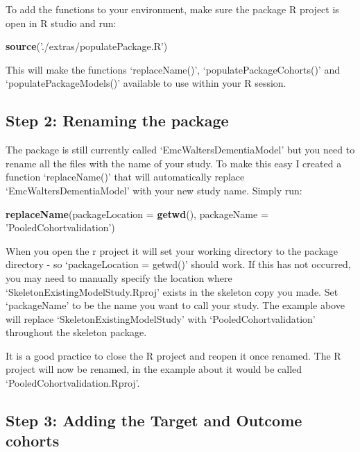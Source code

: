 \documentclass[
]{article}
\newenvironment{Shaded}{\begin{snugshade}}{\end{snugshade}}
\newcommand{\DataTypeTok}[1]{\textcolor[rgb]{0.13,0.29,0.53}{#1}}
\newcommand{\KeywordTok}[1]{\textcolor[rgb]{0.13,0.29,0.53}{\textbf{#1}}}
\newcommand{\NormalTok}[1]{#1}
\newcommand{\StringTok}[1]{\textcolor[rgb]{0.31,0.60,0.02}{#1}}
\begin{document}
To add the functions to your environment, make sure the package R
project is open in R studio and run:

\begin{Shaded}
\begin{Highlighting}[]
\KeywordTok{source}\NormalTok{(}\StringTok{'./extras/populatePackage.R'}\NormalTok{)}
\end{Highlighting}
\end{Shaded}

This will make the functions `replaceName()', `populatePackageCohorts()'
and `populatePackageModels()' available to use within your R session.

\hypertarget{step-2-renaming-the-package}{%
\subsection{Step 2: Renaming the
package}\label{step-2-renaming-the-package}}

The package is still currently called
`EmcWaltersDementiaModel' but you need to rename all the
files with the name of your study. To make this easy I created a
function `replaceName()' that will automatically replace
`EmcWaltersDementiaModel' with your new study name. Simply
run:

\begin{Shaded}
\begin{Highlighting}[]
\KeywordTok{replaceName}\NormalTok{(}\DataTypeTok{packageLocation =} \KeywordTok{getwd}\NormalTok{(), }
          \DataTypeTok{packageName =} \StringTok{'PooledCohortvalidation'}\NormalTok{)}
\end{Highlighting}
\end{Shaded}

When you open the r project it will set your working directory to the
package directory - so `packageLocation = getwd()' should work. If this
has not occurred, you may need to manually specify the location where
`SkeletonExistingModelStudy.Rproj' exists in the skeleton copy you made.
Set `packageName' to be the name you want to call your study. The
example above will replace `SkeletonExistingModelStudy' with
`PooledCohortvalidation' throughout the skeleton package.

It is a good practice to close the R project and reopen it once renamed.
The R project will now be renamed, in the example about it would be
called `PooledCohortvalidation.Rproj'.

\hypertarget{step-3-adding-the-target-and-outcome-cohorts}{%
\subsection{Step 3: Adding the Target and Outcome
cohorts}\label{step-3-adding-the-target-and-outcome-cohorts}}
\end{document}
